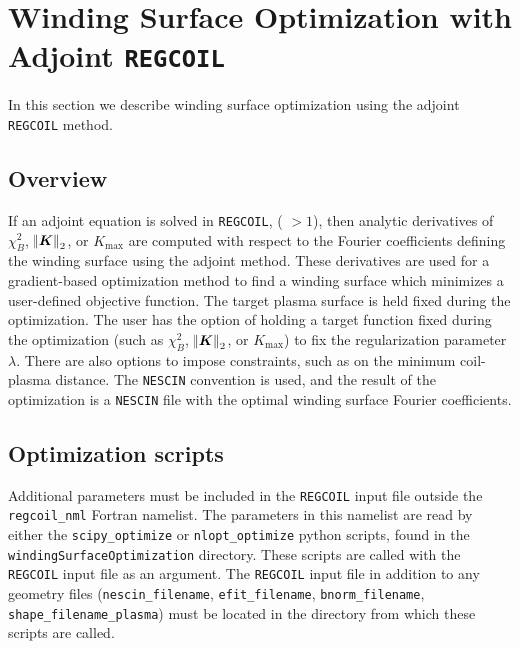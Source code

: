 \myhrule

\chapter{Winding Surface Optimization with Adjoint \texttt{REGCOIL}}
\label{ch:adjoint}

In this section we describe winding surface optimization using the adjoint \texttt{REGCOIL} method. 

\section{Overview}

If an adjoint equation is solved in \texttt{REGCOIL}, ( $> 1$), then analytic derivatives of $\chi^2_B$, $\norm{\bm{K}}_2$, or $K_{\max}$ are computed with respect to the Fourier coefficients defining the winding surface using the adjoint method. These derivatives are used for a gradient-based optimization method to find a winding surface which minimizes a user-defined objective function. The target plasma surface is held fixed during the optimization. The user has the option of holding a target function fixed during the optimization (such as $\chi^2_B$, $\norm{\bm{K}}_2$, or $K_{\max}$) to fix the regularization parameter $\lambda$. There are also options to impose constraints, such as on the minimum coil-plasma distance. The \texttt{NESCIN} convention is used, and the result of the optimization is a \texttt{NESCIN} file with the optimal winding surface Fourier coefficients. 

\section{Optimization scripts}
Additional parameters must be included in the \texttt{REGCOIL} input file outside the \texttt{regcoil\_nml} Fortran namelist. The parameters in this namelist are read by either the \texttt{scipy\_optimize} or \texttt{nlopt\_optimize} python scripts, found in the \texttt{windingSurfaceOptimization} directory. These scripts are called with the \texttt{REGCOIL} input file as an argument. The \texttt{REGCOIL} input file in addition to any geometry files (\texttt{nescin\_filename}, \texttt{efit\_filename}, \texttt{bnorm\_filename}, \texttt{shape\_filename\_plasma}) must be located in the directory from which these scripts are called. 

